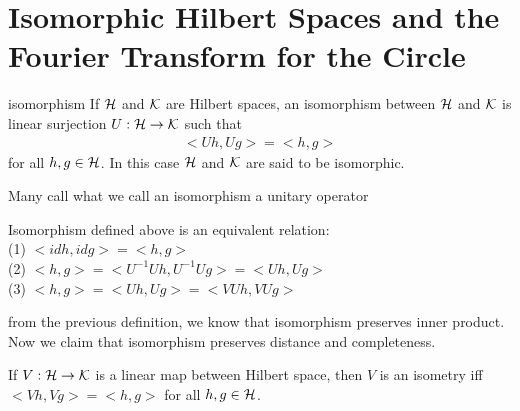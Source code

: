 \chapter{Isomorphic Hilbert Spaces and the Fourier 
Transform for the Circle}\label{chp:1_5}

\begin{definition}{}{isomorphism}
    If $\mathcal{H}$ and $\mathcal{K}$ are Hilbert spaces, an isomorphism between $\mathcal{H}$ and $\mathcal{K}$
    is linear surjection $U:\mathcal{H}\rightarrow \mathcal{K}$ such that
    \begin{align*}
        <Uh,Ug>=<h,g>
    \end{align*}
    for all $h,g\in \mathcal{H}$. In this case $\mathcal{H}$ and $\mathcal{K}$ are said to be isomorphic.
\end{definition}

\begin{remark}
    Many call what we call an isomorphism a unitary operator
\end{remark}

Isomorphism defined above is an equivalent relation:\\
(1) $<id h,id g>= <h,g>$\\
(2) $<h,g>=<U^{-1}Uh,U^{-1}Ug>=<Uh,Ug>$\\
(3) $<h,g>=<Uh,Ug>=<VUh,VUg>$


from the previous definition, we know that isomorphism preserves inner product.
Now we claim that isomorphism preserves distance and completeness. 

\begin{proposition}{}{}
    If $V:\mathcal{H}\rightarrow \mathcal{K}$ is a linear map between Hilbert space, then $V$ is an isometry iff $<Vh,Vg>=<h,g>$ for all $h,g\in \mathcal{H}$.
\end{proposition}